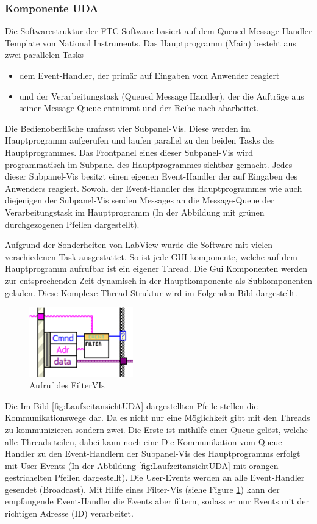 \documentclass[10pt]{scrartcl}
\begin{document}
\subsubsection{Komponente UDA}
Die Softwarestruktur der FTC-Software basiert auf dem Queued Message Handler Template von National Instruments. Das Hauptprogramm (Main) besteht aus zwei parallelen Tasks
\begin{itemize}
	\item dem Event-Handler, der primär auf Eingaben vom Anwender reagiert
	\item und der Verarbeitungstask (Queued Message Handler), der die Aufträge aus seiner Message-Queue entnimmt und der Reihe nach abarbeitet.
\end{itemize}

Die Bedienoberfläche umfasst vier Subpanel-Vis. Diese werden im Hauptprogramm aufgerufen und laufen parallel zu den beiden Tasks des Hauptprogrammes. Das Frontpanel eines dieser Subpanel-Vis wird programmatisch im Subpanel des Hauptprogrammes sichtbar gemacht.  
Jedes dieser Subpanel-Vis besitzt einen eigenen Event-Handler der auf Eingaben des Anwenders reagiert. Sowohl der Event-Handler des Hauptprogrammes wie auch diejenigen der Subpanel-Vis senden Messages an die Message-Queue der Verarbeitungstask im Hauptprogramm (In der Abbildung mit grünen durchgezogenen Pfeilen dargestellt).

Aufgrund der Sonderheiten von LabView wurde die Software mit vielen verschiedenen Task ausgestattet. So ist jede GUI komponente, welche auf dem Hauptprogramm aufrufbar ist ein eigener Thread. Die Gui Komponenten werden zur entsprechenden Zeit dynamisch in der Hauptkomponente als Subkomponenten geladen. Diese Komplexe Thread Struktur wird im Folgenden Bild dargestellt.


\begin{figure}
	\begin{center}
		\includegraphics[width=0.4\textwidth]{filterVI}
		\caption{Aufruf des FilterVIs}
		\label{fig:filterVI}
	\end{center}
\end{figure}
Die Im Bild \ref{fig:LaufzeitansichtUDA} dargestellten Pfeile stellen die Kommunikationswege dar. Da es nicht nur eine Möglichkeit gibt mit den Threads zu kommunizieren sondern zwei. Die Erste ist mithilfe einer Queue gelöst, welche alle Threads teilen, dabei kann noch eine
Die Kommunikation vom Queue Handler zu den Event-Handlern der Subpanel-Vis des Hauptprogramms erfolgt mit User-Events (In der Abbildung \ref{fig:LaufzeitansichtUDA} mit orangen gestrichelten Pfeilen dargestellt). Die User-Events werden an alle Event-Handler gesendet (Broadcast). Mit Hilfe eines Filter-Vis (siehe Figure \ref{fig:filterVI}) kann der empfangende Event-Handler die Events aber filtern, sodass er nur Events mit der richtigen Adresse (ID) verarbeitet.
\end{document}

